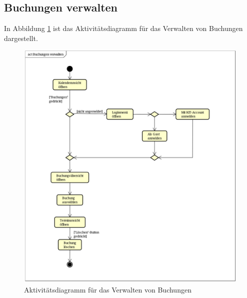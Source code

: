 \subsection{Buchungen verwalten}
In Abbildung \ref{fig:activity_diagram_booking_manage} ist das Aktivitätsdiagramm für das Verwalten von Buchungen dargestellt.
\begin{figure}[ht]
    \centering
    \includegraphics[scale=0.25]{figures/activitydiagrams/buchungverwalten}
    \caption{Aktivitätsdiagramm für das Verwalten von Buchungen}
    \label{fig:activity_diagram_booking_manage}
\end{figure}

\clearpage
